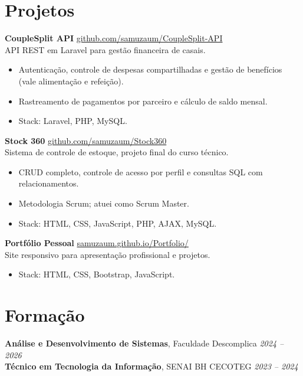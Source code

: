 \documentclass[11pt,a4paper]{article}
\begin{document}
\section{Projetos}

\textbf{CoupleSplit API} \hfill
\href{https://github.com/samuzaum/CoupleSplit-API}{github.com/samuzaum/CoupleSplit-API}\\
API REST em Laravel para gestão financeira de casais.
\begin{itemize}
  \item Autenticação, controle de despesas compartilhadas e gestão de benefícios (vale
        alimentação e refeição).
  \item Rastreamento de pagamentos por parceiro e cálculo de saldo mensal.
  \item Stack: Laravel, PHP, MySQL.
\end{itemize}

\medskip

\textbf{Stock 360} \hfill
\href{https://github.com/samuzaum/Stock360}{github.com/samuzaum/Stock360}\\
Sistema de controle de estoque, projeto final do curso técnico.
\begin{itemize}
  \item CRUD completo, controle de acesso por perfil e consultas SQL com relacionamentos.
  \item Metodologia Scrum; atuei como Scrum Master.
  \item Stack: HTML, CSS, JavaScript, PHP, AJAX, MySQL.
\end{itemize}

\medskip

\textbf{Portfólio Pessoal} \hfill
\href{https://samuzaum.github.io/Portfolio/}{samuzaum.github.io/Portfolio/}\\
Site responsivo para apresentação profissional e projetos.
\begin{itemize}
  \item Stack: HTML, CSS, Bootstrap, JavaScript.
\end{itemize}

\section{Formação}

\textbf{Análise e Desenvolvimento de Sistemas}, Faculdade Descomplica \hfill \textit{2024 -- 2026}\\
\textbf{Técnico em Tecnologia da Informação}, SENAI BH CECOTEG \hfill \textit{2023 -- 2024}
\end{document}
